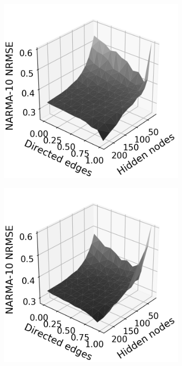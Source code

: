 \begin{figure}[t]
  \centering
  \begin{subfigure}{.32\textwidth}
    \centering
    \includegraphics[width=1.0\linewidth]{figures/rt-dir-perf-sq.png}
    \caption{}
    \label{fig:rt-dir-perf-trisurf-sq}
  \end{subfigure}
  \begin{subfigure}{.32\textwidth}
    \centering
    \includegraphics[width=1.0\linewidth]{figures/rt-dir-perf-hex.png}

\end{subfigure}
\end{figure}
